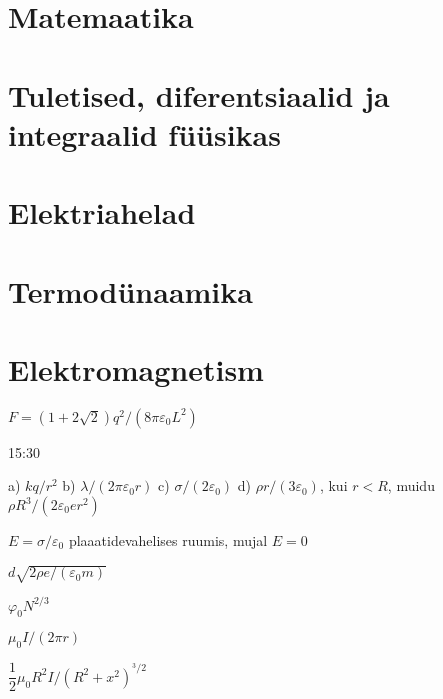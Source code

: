 \documentclass[a4paper,11pt,twocolumn]{article}
\begin{document}
\section{Matemaatika}
\section{Tuletised, diferentsiaalid ja integraalid füüsikas}
\section{Elektriahelad}
\section{Termodünaamika}
\section{Elektromagnetism}
\begin{solutions}
	\item \( F = (1 + 2\sqrt2)q^2/(8\pi\varepsilon_0 L^2) \)
	\item 15:30
	\item a) \( kq/r^2 \) b) \( \lambda/(2\pi\varepsilon_0 r) \) c) \( \sigma/(2\varepsilon_0) \) d) \( \rho r/(3\varepsilon_0) \), kui \( r<R \), muidu \( \rho R^3/(2\varepsilon_0 e r^2) \)
	\item \( E=\sigma/\varepsilon_0 \) plaaatidevahelises ruumis, mujal \( E=0 \)
	\item \( d\sqrt{2\rho e/(\varepsilon_0 m)} \)
	\item \( \varphi_0 N^{2/3} \)
	\item
	\item
	\item
    \item \(\mu_0 I/ (2\pi r)\)
	\item \( \dfrac{1}{2}\mu_0 R^2 I/(R^2+x^2)^{^3/2} \)
\end{solutions}
\end{document}
